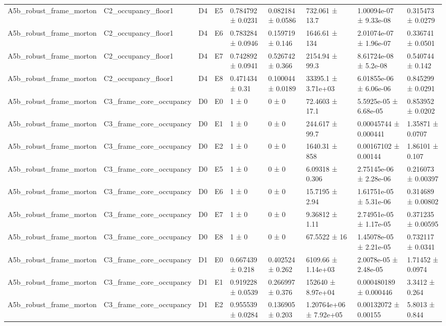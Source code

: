 \begin{table}
\begin{tabular}{lllllllll}
A5b\_robust\_frame\_morton & C2\_occupancy\_floor1 & D4 & E5 & 0.784792 ± 0.0231 & 0.082184 ± 0.0586 & 732.061 ± 13.7 & 1.00094e-07 ± 9.33e-08 & 0.315473 ± 0.0279 \\
A5b\_robust\_frame\_morton & C2\_occupancy\_floor1 & D4 & E6 & 0.783284 ± 0.0946 & 0.159719 ± 0.146 & 1646.61 ± 134 & 2.01074e-07 ± 1.96e-07 & 0.336741 ± 0.0501 \\
A5b\_robust\_frame\_morton & C2\_occupancy\_floor1 & D4 & E7 & 0.742892 ± 0.0941 & 0.526742 ± 0.366 & 2154.94 ± 99.3 & 8.61724e-08 ± 5.2e-08 & 0.540744 ± 0.142 \\
A5b\_robust\_frame\_morton & C2\_occupancy\_floor1 & D4 & E8 & 0.471434 ± 0.31 & 0.100044 ± 0.0189 & 33395.1 ± 3.71e+03 & 6.01855e-06 ± 6.06e-06 & 0.845299 ± 0.0291 \\
A5b\_robust\_frame\_morton & C3\_frame\_core\_occupancy & D0 & E0 & 1 ± 0 & 0 ± 0 & 72.4603 ± 17.1 & 5.5925e-05 ± 6.68e-05 & 0.853952 ± 0.0202 \\
A5b\_robust\_frame\_morton & C3\_frame\_core\_occupancy & D0 & E1 & 1 ± 0 & 0 ± 0 & 244.617 ± 99.7 & 0.00045744 ± 0.000441 & 1.35871 ± 0.0707 \\
A5b\_robust\_frame\_morton & C3\_frame\_core\_occupancy & D0 & E2 & 1 ± 0 & 0 ± 0 & 1640.31 ± 858 & 0.00167102 ± 0.00144 & 1.86101 ± 0.107 \\
A5b\_robust\_frame\_morton & C3\_frame\_core\_occupancy & D0 & E5 & 1 ± 0 & 0 ± 0 & 6.09318 ± 0.306 & 2.75145e-06 ± 2.28e-06 & 0.216073 ± 0.00397 \\
A5b\_robust\_frame\_morton & C3\_frame\_core\_occupancy & D0 & E6 & 1 ± 0 & 0 ± 0 & 15.7195 ± 2.94 & 1.61751e-05 ± 5.31e-06 & 0.314689 ± 0.00802 \\
A5b\_robust\_frame\_morton & C3\_frame\_core\_occupancy & D0 & E7 & 1 ± 0 & 0 ± 0 & 9.36812 ± 1.11 & 2.74951e-05 ± 1.17e-05 & 0.371235 ± 0.00595 \\
A5b\_robust\_frame\_morton & C3\_frame\_core\_occupancy & D0 & E8 & 1 ± 0 & 0 ± 0 & 67.5522 ± 16 & 1.45078e-05 ± 2.21e-05 & 0.732117 ± 0.0341 \\
A5b\_robust\_frame\_morton & C3\_frame\_core\_occupancy & D1 & E0 & 0.667439 ± 0.218 & 0.402524 ± 0.262 & 6109.66 ± 1.14e+03 & 2.0078e-05 ± 2.48e-05 & 1.71452 ± 0.0974 \\
A5b\_robust\_frame\_morton & C3\_frame\_core\_occupancy & D1 & E1 & 0.919228 ± 0.0539 & 0.266997 ± 0.376 & 152640 ± 8.97e+04 & 0.000480189 ± 0.000446 & 3.3412 ± 0.264 \\
A5b\_robust\_frame\_morton & C3\_frame\_core\_occupancy & D1 & E2 & 0.955539 ± 0.0284 & 0.136905 ± 0.203 & 1.20764e+06 ± 7.92e+05 & 0.00132072 ± 0.00155 & 5.8013 ± 0.844 \\

\end{tabular}
\end{table}
